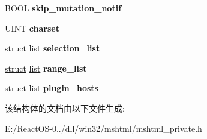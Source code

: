 \begin{DoxyCompactItemize}
$$B\+O\+OL {\bfseries skip\+\_\+mutation\+\_\+notif}
\item 
\mbox{\label{struct_h_t_m_l_document_node_acab2c12f2a04b0f169699073e08657ed}} 
U\+I\+NT {\bfseries charset}
\item 
\mbox{\label{struct_h_t_m_l_document_node_a675f9c9816b5bd7c50d4868e427e81ce}} 
\hyperlink{interfacestruct}{struct} \hyperlink{classlist}{list} {\bfseries selection\+\_\+list}
\item 
\mbox{\label{struct_h_t_m_l_document_node_ad17898978be7373842847966c67ab4a5}} 
\hyperlink{interfacestruct}{struct} \hyperlink{classlist}{list} {\bfseries range\+\_\+list}
\item 
\mbox{\label{struct_h_t_m_l_document_node_a3c6b3bdbb32acf16e43cc6391537da29}} 
\hyperlink{interfacestruct}{struct} \hyperlink{classlist}{list} {\bfseries plugin\+\_\+hosts}
\end{DoxyCompactItemize}


该结构体的文档由以下文件生成\+:\begin{DoxyCompactItemize}
\item 
E\+:/\+React\+O\+S-\/0../dll/win32/mshtml/mshtml\+\_\+private.\+h\end{DoxyCompactItemize}
